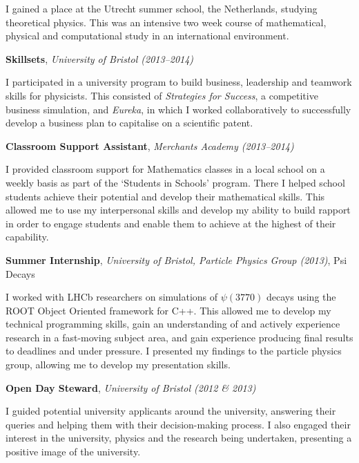 \documentclass[11pt,a4paper,sans]{moderncv}
\begin{document}
I gained a place at the Utrecht summer school, the Netherlands, studying
theoretical physics. This was an intensive two week course of mathematical,
physical and computational study in an international environment.

\vspace{1em}

{\large\textbf{Skillsets}, \textit{University of Bristol (2013--2014)}}

I participated in a university program to build business, leadership and
teamwork skills for physicists. This consisted of \textit{Strategies for
Success}, a competitive business simulation, and \textit{Eureka}, in which I
worked collaboratively to successfully develop a business plan to capitalise on
a scientific patent.

\vspace{1em}

{\large\textbf{Classroom Support Assistant}, \textit{Merchants Academy (2013--2014)}}

I provided classroom support for Mathematics classes in a local school on a
weekly basis as part of the `Students in Schools' program. There I helped school
students achieve their potential and develop their mathematical skills. This
allowed me to use my interpersonal skills and develop my ability to build
rapport in order to engage students and enable them to achieve at the highest of
their capability.

\vspace{1em}

{\large\textbf{Summer Internship}, \textit{University of Bristol, Particle
Physics Group (2013)}, Psi Decays}

I worked with LHCb researchers on simulations of $\psi(3770)$ decays using the
ROOT Object Oriented framework for C++. This allowed me to develop my technical
programming skills, gain an understanding of and actively experience research in
a fast-moving subject area, and gain experience producing final results to
deadlines and under pressure. I presented my findings to the particle physics
group, allowing me to develop my presentation skills.
    
\vspace{1em}

{\large\textbf{Open Day Steward}, \textit{University of Bristol (2012 \& 2013)}
}

I guided potential university applicants around the university, answering their
queries and helping them with their decision-making process. I also engaged
their interest in the university, physics and the research being undertaken,
presenting a positive image of the university.
    
\end{document}
